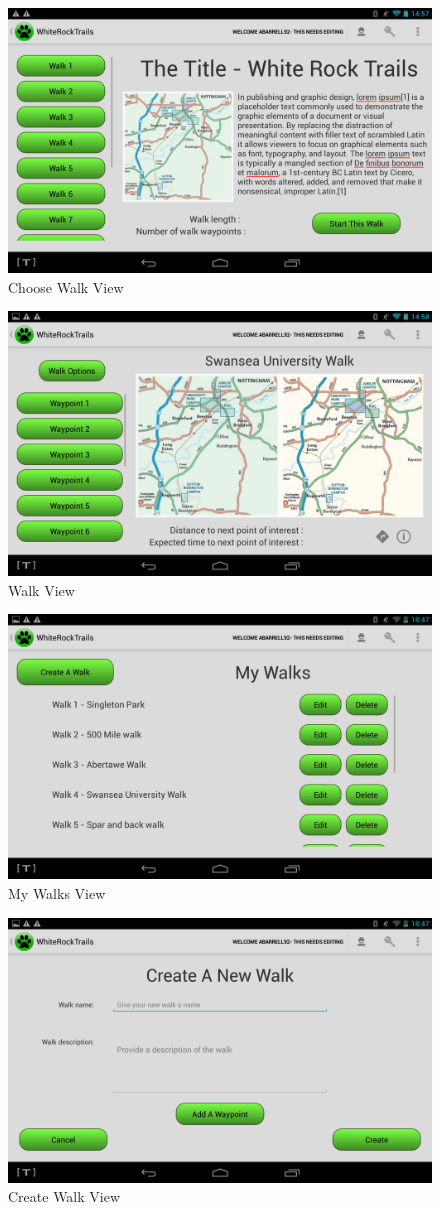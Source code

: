 \documentclass[11pt,a4paper]{article}
\begin{document}
\begin{appendices}
\begin{figure}[H]
\centering
\includegraphics[width=0.6\linewidth]{./img/app_choose_walk}
\caption{Choose Walk View}
\end{figure}

\begin{figure}[H]
\centering
\includegraphics[width=0.6\linewidth]{./img/app_walk_view}
\caption{Walk View}
\end{figure}

\begin{figure}[H]
\centering
\includegraphics[width=0.6\linewidth]{./img/my_walks}
\caption{My Walks View}
\end{figure}

\begin{figure}[H]
\centering
\includegraphics[width=0.6\linewidth]{./img/create_walk}
\caption{Create Walk View}
\end{figure}


\end{appendices}
\end{document}
